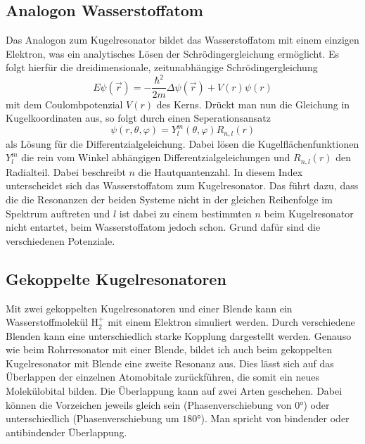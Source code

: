 \subsection{Analogon Wasserstoffatom}
Das Analogon zum Kugelresonator bildet das Wasserstoffatom mit einem einzigen Elektron, was ein analytisches
Lösen der Schrödingergleichung ermöglicht.
Es folgt hierfür die dreidimensionale, zeitunabhängige Schrödingergleichung
\begin{equation}
    E\psi(\vec{r})=-\frac{\hbar^2}{2m}\Delta\psi(\vec{r})+V(r)\psi(r)
\end{equation}
mit dem Coulombpotenzial $V(r)$ des Kerns. Drückt man nun die Gleichung in Kugelkoordinaten aus, 
so folgt durch einen Seperationsansatz 
\begin{equation}
    \psi(r{,}\theta{,}\varphi)=Y_l^m(\theta{,}\varphi)R_{n{,}l}(r)
\end{equation}
als Lösung für die Differentzialgeleichung. Dabei lösen die Kugelflächenfunktionen $Y_l^m$
die rein vom Winkel abhängigen Differentzialgeleichungen und $R_{n{,}l}(r)$ den Radialteil. Dabei beschreibt
$n$ die Hautquantenzahl. In diesem Index unterscheidet sich das Wasserstoffatom zum Kugelresonator. Das führt dazu, dass die
die Resonanzen der beiden Systeme nicht in der gleichen Reihenfolge im Spektrum auftreten und $l$ ist dabei zu einem bestimmten
$n$ beim Kugelresonator nicht entartet, beim Wasserstoffatom jedoch schon. Grund dafür sind die verschiedenen Potenziale.

\subsection{Gekoppelte Kugelresonatoren}
Mit zwei gekoppelten Kugelresonatoren und einer Blende kann ein Wasserstoffmolekül $\text{H}_2^+$ mit einem Elektron simuliert werden.
Durch verschiedene Blenden kann eine unterschiedlich starke Kopplung dargestellt werden.
Genauso wie beim Rohrresonator mit einer Blende, bildet ich auch beim gekoppelten Kugelresonator mit Blende eine zweite Resonanz aus.
Dies lässt sich auf das Überlappen der einzelnen Atomobitale zurückführen, die somit ein neues Molekülobital bilden. Die Überlappung kann auf zwei Arten geschehen.
Dabei können die Vorzeichen jeweils gleich sein (Phasenverschiebung von $0°$) oder unterschiedlich (Phasenverschiebung um $180°$). Man spricht von
bindender oder antibindender Überlappung.\\

